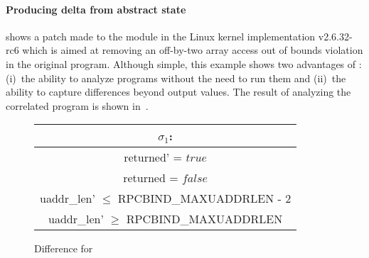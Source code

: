 
\paragraph{Producing delta from abstract state}



 shows a patch made to the  module in the Linux kernel  implementation v2.6.32-rc6 which is aimed at removing an off-by-two array access out of bounds violation in the original program. Although simple, this example shows two advantages of {\tool}: (i)~the ability to analyze programs without the need to run them and (ii)~the ability to capture differences beyond output values. The result of analyzing the correlated program is shown in~.

\begin{figure}
\scriptsize
\centering
\begin{tabular}{c}
$\sigma_1$:
\\ \hline
returned' = $true$
\\
returned = $false$
\\
uaddr\_len' $\leq$ RPCBIND\_MAXUADDRLEN - 2
\\
uaddr\_len' $\geq$ RPCBIND\_MAXUADDRLEN
\\ \hline
\end{tabular}
\caption{Difference for }\label{Fi:sunrpc}

\end{figure}

